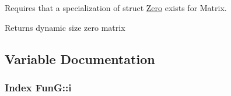 \-Requires that a specialization of struct \hyperlink{structFunG_1_1Zero}{\-Zero} exists for \-Matrix. 

\begin{DoxyReturn}{\-Returns}
dynamic size zero matrix 
\end{DoxyReturn}


\subsection{\-Variable \-Documentation}
\hypertarget{namespaceFunG_a596429cd53658fe4796a76dd39d6a8da}{
\subsubsection[{i}]{ \-Index {\bf \-Fun\-G\-::i}}}\label{namespaceFunG_a596429cd53658fe4796a76dd39d6a8da}

